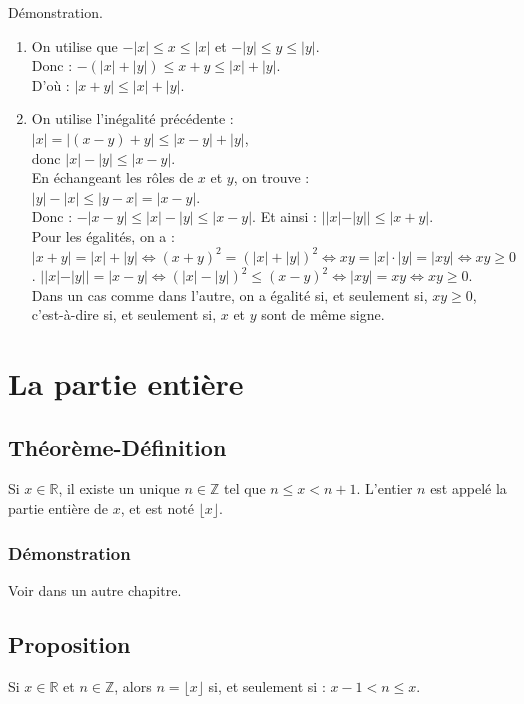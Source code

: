 \documentclass{article}
\begin{document}
		Démonstration. 
		\begin{enumerate}
			\item On utilise que $-|x| \leq x \leq |x|$ et $-|y| \leq y \leq |y|$. \\
			 Donc : $- (|x| + |y|) \leq x + y \leq |x| + |y|$. \\
			  D'où : $|x + y| \leq |x| + |y|$.
			\item On utilise l'inégalité précédente : \\ $|x| = |(x - y) + y| \leq |x - y| + |y|$,\\ donc $|x| - |y| \leq |x - y|$. \\ En échangeant les rôles de $x$ et $y$, on trouve : \\ $|y| - |x| \leq |y - x| = |x - y|$. \\ Donc : $-|x - y| \leq |x| - |y| \leq |x - y|$. Et ainsi : $||x| - |y|| \leq |x + y|$. \\ Pour les égalités, on a : $|x + y| = |x| + |y| \Leftrightarrow (x + y)^2 = (|x| + |y|)^2 \Leftrightarrow xy = |x| \cdot |y| = |xy| \Leftrightarrow xy \geq 0$. $||x| - |y|| = |x - y| \Leftrightarrow (|x| - |y|)^2 \leq (x - y)^2 \Leftrightarrow |xy| = xy \Leftrightarrow xy \geq 0$. \\ Dans un cas comme dans l'autre, on a égalité si, et seulement si, $xy \geq 0$, c'est-à-dire si, et seulement si, $x$ et $y$ sont de même signe.
		\end{enumerate}
		\section{La partie entière}
		
		\subsection{Théorème-Définition }
		Si $x \in \mathbb{R}$, il existe un unique $n \in \mathbb{Z}$ tel que $n \leq x < n + 1$. L'entier $n$ est appelé la partie entière de $x$, et est noté $\lfloor x \rfloor$.
		
		\subsubsection{Démonstration}
		Voir dans un autre chapitre.
		
		\subsection{Proposition }
		Si $x \in \mathbb{R}$ et $n \in \mathbb{Z}$, alors $n = \lfloor x \rfloor$ si, et seulement si : $x - 1 < n \leq x$.
		
\end{document}
